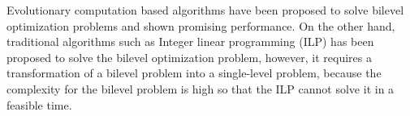 Evolutionary computation based algorithms have been proposed to solve bilevel optimization problems \cite{Wang:2008kb, Wang:2011di, Angelo:2013ee} and shown promising performance. On the other hand, traditional algorithms such as Integer linear programming (ILP) has been proposed to solve the bilevel optimization problem, however, it requires a transformation of a bilevel problem into a single-level problem, because the complexity for the bilevel problem is high so that the ILP cannot solve it in a feasible time. 





